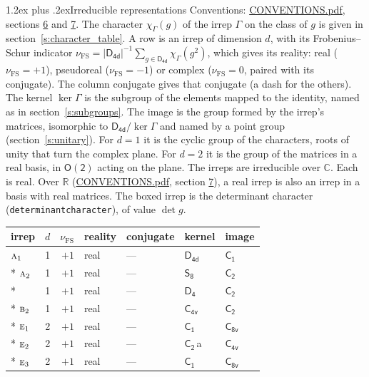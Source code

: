\documentclass[10pt,a4paper]{article}
\makeatletter
\renewcommand\section{\@startsection{section}{1}{\z@}{-3ex plus -1ex minus -.2ex}%
  {1.2ex plus .2ex}{\normalfont\large\sffamily\bfseries\color{parttitle}}}
\numberwithin{equation}{section}
\newcommand{\grp}[1]{\mathsf{#1}}
\newcommand{\irr}[1]{\text{\normalfont\scshape #1}}
\newcommand{\detbox}[1]{{\setlength{\fboxsep}{1pt}\fbox{#1}}}
\newcommand{\clsletter}[1]{\,{\scriptsize\color{black!55}#1}}
\newcommand{\irchar}[1]{\chi_{#1}}
\newcommand{\fsind}{\nu_{\mathrm{FS}}}
\makeatother
\begin{document}
\section{Irreducible representations}\label{s:irreps}
Conventions: \href{../../CONVENTIONS.pdf}{CONVENTIONS.pdf}, sections \href{../../CONVENTIONS.pdf\#conv.6}{6} and \href{../../CONVENTIONS.pdf\#conv.7}{7}.
\leavevmode\label{n:function.character}\label{n:irrep.Gamma}The character $\irchar{\Gamma}(g)$ of the irrep $\Gamma$ on the class of $g$ is given in section~\ref{s:character_table}.
\leavevmode\label{n:index.dimension}\label{n:index.frobenius}\label{n:head.irrep}\label{n:head.reality}A row is an irrep of dimension $d$, with its Frobenius--Schur indicator $\fsind = |\grp{D_{4d}}|^{-1}\allowbreak\sum_{g\in\grp{D_{4d}}}\irchar{\Gamma}(g^2)$, which gives its reality: real ($\fsind = +1$), pseudoreal ($\fsind = -1$) or complex ($\fsind = 0$, paired with its conjugate). \label{n:head.conjugate}The column conjugate gives that conjugate (a dash for the others). \label{n:head.kernel}The kernel $\ker\Gamma$ is the subgroup of the elements mapped to the identity, named as in section~\ref{s:subgroups}. \label{n:head.image}The image is the group formed by the irrep's matrices, isomorphic to $\grp{D_{4d}}/\ker\Gamma$ and named by a point group (section~\ref{s:unitary}). For $d = 1$ it is the cyclic group of the characters, roots of unity that turn the complex plane. For $d = 2$ it is the group of the matrices in a real basis, in $\grp{O(2)}$ acting on the plane. The irreps are irreducible over $\mathbb{C}$. Each is real. Over $\mathbb{R}$ (\href{../../CONVENTIONS.pdf}{CONVENTIONS.pdf}, section \href{../../CONVENTIONS.pdf\#conv.7}{7}), a real irrep is also an irrep in a basis with real matrices. \label{n:mark.determinant}The boxed irrep is the determinant character (\texttt{determinantcharacter}), of value $\det g$.
\setlength{\emergencystretch}{2em}\par\setlength{\emergencystretch}{0pt}
{\small\renewcommand{\arraystretch}{1.25}\begin{longtable}{@{}lrrllll@{}}\toprule
irrep & $d$ & $\fsind$ & reality & conjugate & kernel & image\\\midrule\endhead
\bottomrule\endfoot\endlastfoot
$\irr{a}_{1}$ & 1 & $+1$ & real & --- & \href{D4d.pdf}{$\grp{D_{4d}}$} & \href{C1.pdf}{$\grp{C_{1}}$}\\*
$\irr{a}_{2}$ & 1 & $+1$ & real & --- & \href{S8.pdf}{$\grp{S_{8}}$} & \href{C2.pdf}{$\grp{C_{2}}$}\\*
\detbox{$\irr{b}_{1}$} & 1 & $+1$ & real & --- & \href{D4.pdf}{$\grp{D_{4}}$} & \href{C2.pdf}{$\grp{C_{2}}$}\\*
$\irr{b}_{2}$ & 1 & $+1$ & real & --- & \href{C4v.pdf}{$\grp{C_{4v}}$} & \href{C2.pdf}{$\grp{C_{2}}$}\\*
$\irr{e}_{1}$ & 2 & $+1$ & real & --- & \href{C1.pdf}{$\grp{C_{1}}$} & \href{C8v.pdf}{$\grp{C_{8v}}$}\\*
$\irr{e}_{2}$ & 2 & $+1$ & real & --- & \href{C2.pdf}{$\grp{C_{2}}$}\clsletter{a} & \href{C4v.pdf}{$\grp{C_{4v}}$}\\*
$\irr{e}_{3}$ & 2 & $+1$ & real & --- & \href{C1.pdf}{$\grp{C_{1}}$} & \href{C8v.pdf}{$\grp{C_{8v}}$}\\
\bottomrule\end{longtable}}
\end{document}
